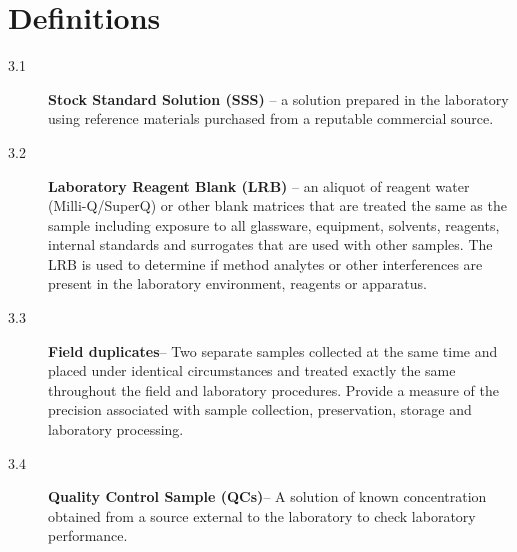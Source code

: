\documentclass{article}
\begin{document}
\section{Definitions}
\begin{description}
\item[3.1] \textbf{Stock Standard Solution (SSS)} -- a solution prepared in the laboratory using reference materials purchased from a reputable commercial source.
\item[3.2] \textbf{Laboratory Reagent Blank (LRB)} -- an aliquot of reagent water (Milli-Q/SuperQ) or other blank matrices that are treated the same as the sample including exposure to all glassware, equipment, solvents, reagents, internal standards and surrogates that are used with other samples. The LRB is used to determine if method analytes or other interferences are present in the laboratory environment, reagents or apparatus. 
\item[3.3]\textbf{Field duplicates}-- Two separate samples collected at the same time and placed under identical circumstances and treated exactly the same throughout the field and laboratory procedures. Provide a measure of the precision associated with sample collection, preservation, storage and laboratory processing. 
\item[3.4] \textbf{Quality Control Sample (QCs)}-- A solution of known concentration obtained from a source external to the laboratory to check laboratory performance.  
\end{description}
\end{document}
